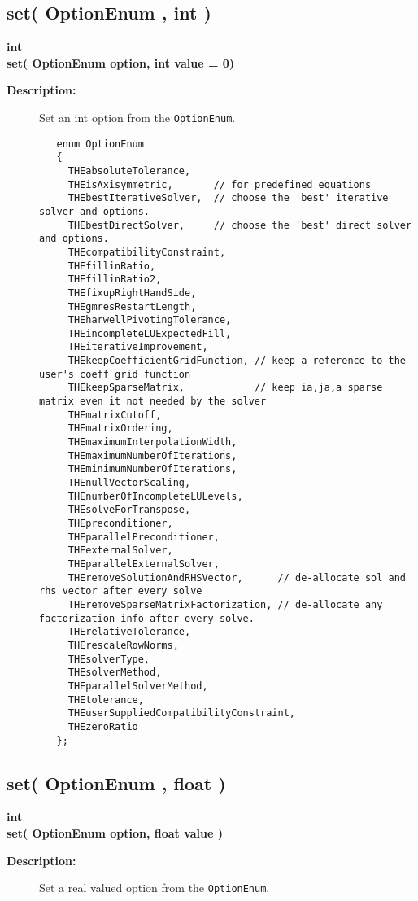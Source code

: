 \subsection{set( OptionEnum , int )}
 
\begin{flushleft} \textbf{%
int  \\ 
\settowidth{\OgesParametersIncludeArgIndent}{set(}%
set( OptionEnum option, int value  = 0)
}\end{flushleft}
\begin{description}
\item[{\bf Description:}] 
   Set an int option from the {\tt OptionEnum}.
 \begin{verbatim}
   enum OptionEnum
   {
     THEabsoluteTolerance,
     THEisAxisymmetric,       // for predefined equations
     THEbestIterativeSolver,  // choose the 'best' iterative solver and options.
     THEbestDirectSolver,     // choose the 'best' direct solver and options.
     THEcompatibilityConstraint,
     THEfillinRatio,
     THEfillinRatio2,
     THEfixupRightHandSide,
     THEgmresRestartLength,
     THEharwellPivotingTolerance,
     THEincompleteLUExpectedFill,
     THEiterativeImprovement,
     THEkeepCoefficientGridFunction, // keep a reference to the user's coeff grid function
     THEkeepSparseMatrix,            // keep ia,ja,a sparse matrix even it not needed by the solver
     THEmatrixCutoff,
     THEmatrixOrdering,
     THEmaximumInterpolationWidth,
     THEmaximumNumberOfIterations,
     THEminimumNumberOfIterations,
     THEnullVectorScaling,
     THEnumberOfIncompleteLULevels,
     THEsolveForTranspose,
     THEpreconditioner,
     THEparallelPreconditioner,
     THEexternalSolver,
     THEparallelExternalSolver,
     THEremoveSolutionAndRHSVector,      // de-allocate sol and rhs vector after every solve
     THEremoveSparseMatrixFactorization, // de-allocate any factorization info after every solve.
     THErelativeTolerance,
     THErescaleRowNorms,
     THEsolverType,
     THEsolverMethod,
     THEparallelSolverMethod,
     THEtolerance,
     THEuserSuppliedCompatibilityConstraint,
     THEzeroRatio
   };
 \end{verbatim}
\end{description}
\subsection{set( OptionEnum , float )}
 
\begin{flushleft} \textbf{%
int  \\ 
\settowidth{\OgesParametersIncludeArgIndent}{set(}%
set( OptionEnum option, float value )
}\end{flushleft}
\begin{description}
\item[{\bf Description:}] 
    Set a real valued option from the {\tt OptionEnum}.
 \begin{verbatim}
 \end{verbatim}
\end{description}
